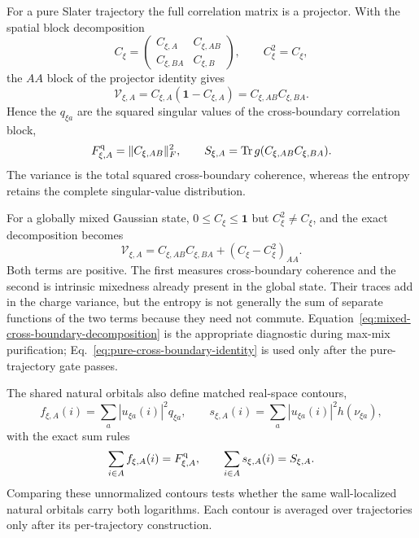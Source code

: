 \documentclass[aps,prx,onecolumn,nofootinbib,superscriptaddress,longbibliography]{revtex4-2}
\newcommand{\Id}{\mathbf{1}}
\newcommand{\qTr}{\operatorname{Tr}}
\begin{document}
For a pure Slater trajectory the full correlation matrix is a projector.  With the spatial
block decomposition
\begin{equation}
 C_\xi=
 \begin{pmatrix}
 C_{\xi,A}&C_{\xi,AB}\\
 C_{\xi,BA}&C_{\xi,B}
 \end{pmatrix},
 \qquad C_\xi^2=C_\xi,
\end{equation}
the $AA$ block of the projector identity gives
\begin{equation}
 \mathcal V_{\xi,A}
 =C_{\xi,A}(\Id-C_{\xi,A})
 =C_{\xi,AB}C_{\xi,BA}.
 \label{eq:pure-cross-boundary-identity}
\end{equation}
Hence the $q_{\xi a}$ are the squared singular values of the cross-boundary correlation
block,
\begin{equation}
 F_{\xi,A}^{\rm q}=\|C_{\xi,AB}\|_F^2,
 \qquad
 S_{\xi,A}=\qTr g(C_{\xi,AB}C_{\xi,BA}).
 \label{eq:cross-boundary-spectral-functionals}
\end{equation}
The variance is the total squared cross-boundary coherence, whereas the entropy retains
the complete singular-value distribution.

For a globally mixed Gaussian state, $0\leq C_\xi\leq\Id$ but $C_\xi^2\ne C_\xi$, and the
exact decomposition becomes
\begin{equation}
 \mathcal V_{\xi,A}
 =C_{\xi,AB}C_{\xi,BA}+(C_\xi-C_\xi^2)_{AA}.
 \label{eq:mixed-cross-boundary-decomposition}
\end{equation}
Both terms are positive.  The first measures cross-boundary coherence and the second is
intrinsic mixedness already present in the global state.  Their traces add in the charge
variance, but the entropy is not generally the sum of separate functions of the two terms
because they need not commute.  Equation~\eqref{eq:mixed-cross-boundary-decomposition} is
the appropriate diagnostic during max-mix purification; Eq.~\eqref{eq:pure-cross-boundary-identity}
is used only after the pure-trajectory gate passes.

The shared natural orbitals also define matched real-space contours,
\begin{equation}
 f_{\xi,A}(i)=\sum_a|u_{\xi a}(i)|^2q_{\xi a},
 \qquad
 s_{\xi,A}(i)=\sum_a|u_{\xi a}(i)|^2h(\nu_{\xi a}),
 \label{eq:matched-entropy-variance-contours}
\end{equation}
with the exact sum rules
\begin{equation}
 \sum_{i\in A}f_{\xi,A}(i)=F_{\xi,A}^{\rm q},
 \qquad
 \sum_{i\in A}s_{\xi,A}(i)=S_{\xi,A}.
 \label{eq:matched-contour-sum-rules}
\end{equation}
Comparing these unnormalized contours tests whether the same wall-localized natural
orbitals carry both logarithms.  Each contour is averaged over trajectories only after its
per-trajectory construction.
\end{document}
